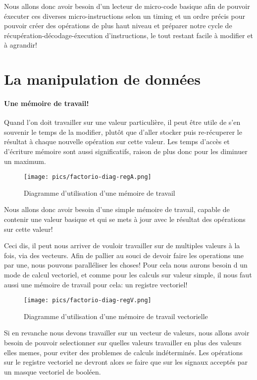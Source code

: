 Nous allons donc avoir besoin d'un lecteur de micro-code basique afin de pouvoir éxecuter ces diverses micro-instructions selon un timing et un ordre précis pour pouvoir créer des opérations de plus haut niveau et préparer notre cycle de récupération-décodage-éxecution d'instructions, le tout restant facile à modifier et à agrandir!

\section{La manipulation de données}

\paragraph{Une mémoire de travail!}
Quand l'on doit travailler sur une valeur particulière, il peut être utile de s'en souvenir le temps de la modifier, plutôt que d'aller stocker puis re-récuperer le résultat à chaque nouvelle opération sur cette valeur.
Les temps d'accès et d'écriture mémoire sont aussi significatifs, raison de plus donc pour les diminuer un maximum.

\begin{figure}[h]
\centering
\texttt{[image: pics/factorio-diag-regA.png]}

\caption{Diagramme d'utilisation d'une mémoire de travail}
\end{figure}

Nous allons donc avoir besoin d'une simple mémoire de travail, capable de contenir une valeur basique et qui se mets à jour avec le résultat des opérations sur cette valeur!


Ceci dis, il peut nous arriver de vouloir travailler sur de multiples valeurs à la fois, via des vecteurs.
Afin de pallier au souci de devoir faire les operations une par une, nous pouvons paralléliser les choses! 
Pour cela nous aurons besoin d un mode de calcul vectoriel, et comme pour les calculs sur valeur simple, il nous faut aussi une mémoire de travail pour cela: un registre vectoriel!

\begin{figure}[h]
\centering
\texttt{[image: pics/factorio-diag-regV.png]}

\caption{Diagramme d'utilisation d'une mémoire de travail vectorielle}
\end{figure}

Si en revanche nous devons travailler sur un vecteur de valeurs, nous allons avoir besoin de pouvoir selectionner sur quelles valeurs travailler en plus des valeurs elles memes, pour eviter des problemes de calculs indéterminés.
Les opérations sur le registre vectoriel ne devront alors se faire que sur les signaux acceptés par un masque vectoriel de booléen.


